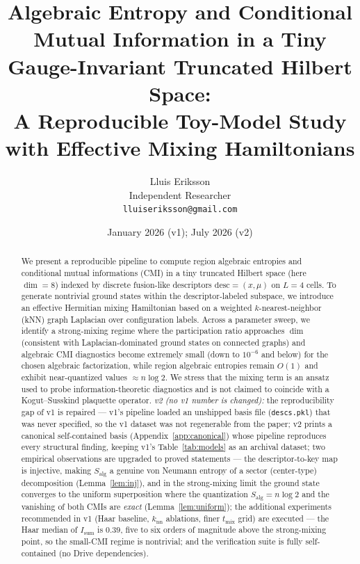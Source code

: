 \documentclass[11pt]{article}
\title{Algebraic Entropy and Conditional Mutual Information in a Tiny
Gauge-Invariant Truncated Hilbert Space:\\
\large A Reproducible Toy-Model Study with Effective Mixing
Hamiltonians}
\author{Lluis Eriksson\\
\small Independent Researcher\\
\small \texttt{lluiseriksson@gmail.com}}
\date{January 2026 (v1); July 2026 (v2)}
\theoremstyle{remark}
\newcommand{\Salg}{S_{\mathrm{alg}}}
\begin{document}
\maketitle

\begin{abstract}
We present a reproducible pipeline to compute region algebraic entropies
and conditional mutual informations (CMI) in a tiny truncated Hilbert
space (here $\dim = 8$) indexed by discrete fusion-like descriptors
$\mathrm{desc} = (x, \mu)$ on $L = 4$ cells. To generate nontrivial
ground states within the descriptor-labeled subspace, we introduce an
effective Hermitian mixing Hamiltonian based on a weighted
$k$-nearest-neighbor (kNN) graph Laplacian over configuration labels.
Across a parameter sweep, we identify a strong-mixing regime where the
participation ratio approaches $\dim$ (consistent with
Laplacian-dominated ground states on connected graphs) and algebraic CMI
diagnostics become extremely small (down to $10^{-6}$ and below) for the
chosen algebraic factorization, while region algebraic entropies remain
$O(1)$ and exhibit near-quantized values $\approx n\log 2$. We stress
that the mixing term is an ansatz used to probe information-theoretic
diagnostics and is not claimed to coincide with a Kogut--Susskind
plaquette operator. \emph{v2 (no v1 number is changed):} the
reproducibility gap of v1 is repaired --- v1's pipeline loaded an
unshipped basis file (\texttt{descs.pkl}) that was never specified, so
the v1 dataset was not regenerable from the paper; v2 prints a canonical
self-contained basis (Appendix~\ref{app:canonical}) whose pipeline
reproduces every structural finding, keeping v1's Table~\ref{tab:models}
as an archival dataset; two empirical observations are upgraded to
proved statements --- the descriptor-to-key map is injective, making
$\Salg$ a genuine von Neumann entropy of a sector (center-type)
decomposition (Lemma~\ref{lem:inj}), and in the strong-mixing limit the
ground state converges to the uniform superposition where the
quantization $\Salg = n\log 2$ and the vanishing of both CMIs are
\emph{exact} (Lemma~\ref{lem:uniform}); the additional experiments
recommended in v1 (Haar baseline, $k_{\mathrm{nn}}$ ablations, finer
$t_{\mathrm{mix}}$ grid) are executed --- the Haar median of
$I_{\mathrm{sum}}$ is $0.39$, five to six orders of magnitude above the
strong-mixing point, so the small-CMI regime is nontrivial; and the
verification suite is fully self-contained (no Drive dependencies).
\end{abstract}
\end{document}

